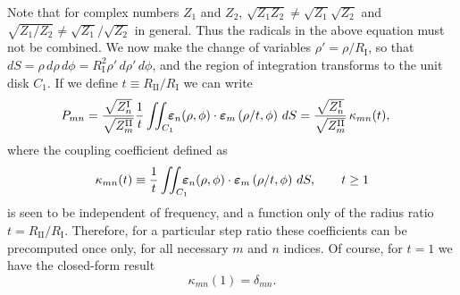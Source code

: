 \documentclass[11pt]{article}
\newcommand{\enorm}{\boldsymbol{\varepsilon}}
\newcommand{\I}{\ensuremath{\text{I}}}
\newcommand{\II}{\ensuremath{\text{II}}}
\begin{document}
Note that for complex numbers $Z_1$ and $Z_2$, $\sqrt{Z_1 Z_2} \neq
\sqrt{Z_1} \sqrt{Z_2}$ and $\sqrt{Z_1/Z_2} \neq
\sqrt{Z_1}/\sqrt{Z_2}$ in general.  Thus the radicals in the above
equation must not be combined.
We now make the change of variables $\rho'=\rho/R_\I$, so that
$dS = \rho\,d\rho\,d\phi = R_\I^2 \rho' \, d\rho' \, d\phi$, and the region of integration
transforms to the unit disk $C_1$.  If we define $t \equiv
R_{\II}/R_{\I}$ we can write 
\begin{align}
  \label{eq:23}
  P_{mn} 
  &= \frac{\sqrt{Z^\I_n}}{\sqrt{Z^\II_m}} \frac{1}{t}
  \iint_{C_1} \mkern-12mu \enorm_n(\rho,\phi) \cdot 
  \enorm_m\left(\rho/t, \phi \right) \, dS 
  = \frac{\sqrt{Z^\I_n}}{\sqrt{Z^\II_m}} \, \kappa_{mn}(t),
\end{align}
where the coupling coefficient defined as
\begin{equation}
  \label{eq:24}
  \kappa_{mn}(t) \equiv \frac{1}{t} \iint_{C_1} \mkern-12mu 
  \enorm_n(\rho,\phi) \cdot 
  \enorm_m\left(\rho/t, \phi\right) \, dS, \qquad t \geq 1
\end{equation}
is seen to be independent of frequency, and a function only of the
radius ratio $t = R_\II / R_\I$.  Therefore, for a particular step ratio these
coefficients can be precomputed once only, for all necessary $m$ and
$n$ indices. 
Of course, for $t = 1$ we have the
closed-form result
\begin{equation}
  \label{eq:26}
  \kappa_{mn}(1) = \delta_{mn}.
\end{equation}
\end{document}
